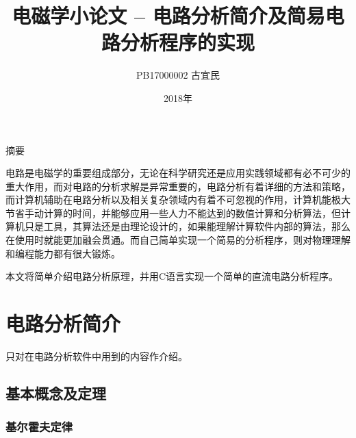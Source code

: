 \documentclass[UTF-8,cs4size]{ctexart}
\title{电磁学小论文 -- 电路分析简介及简易电路分析程序的实现}
\author{PB17000002  古宜民}
\date{2018年}
\begin{document}
 \normalsize
\maketitle
\begin{center}
	摘要
\end{center}

电路是电磁学的重要组成部分，无论在科学研究还是应用实践领域都有必不可少的重大作用，而对电路的分析求解是异常重要的，电路分析有着详细的方法和策略，而计算机辅助在电路分析以及相关复杂领域内有着不可忽视的作用，计算机能极大节省手动计算的时间，并能够应用一些人力不能达到的数值计算和分析算法，但计算机只是工具，其算法还是由理论设计的，如果能理解计算软件内部的算法，那么在使用时就能更加融会贯通。而自己简单实现一个简易的分析程序，则对物理理解和编程能力都有很大锻炼。


本文将简单介绍电路分析原理，并用C语言实现一个简单的直流电路分析程序。
\clearpage
\section{电路分析简介}
只对在电路分析软件中用到的内容作介绍。 \\
\subsection{基本概念及定理}
\subsubsection{基尔霍夫定律}
\end{document}
